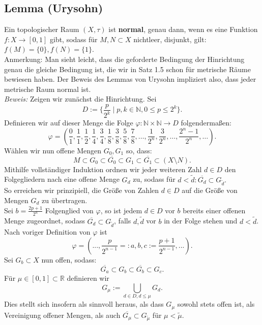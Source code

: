 \documentclass[11pt,leqno]{article}
\newcommand{\R}{\mathbb{R}}
\begin{document}
\subsection{Lemma (Urysohn)}

Ein topologischer Raum $(X, \tau)$ ist \textbf{normal}, genau dann, wenn es eine Funktion $f:X \rightarrow [0,1]$ gibt, sodass für $M,N \subset X$
nichtleer, disjunkt, gilt: $f(M)=\{0\}, f(N)=\{1\}$. \\
Anmerkung: Man sieht leicht, dass die geforderte Bedingung der Hinrichtung genau die gleiche Bedingung ist, die wir in Satz 1.5 schon für 
metrische Räume bewiesen haben. Der Beweis des Lemmas von Urysohn impliziert also, dass jeder metrische Raum normal ist.\\
\textit{Beweis:} Zeigen wir zunächst die Hinrichtung. Sei
\[D:= \{\frac{p}{2^k} \mid p,k \in \mathbb{N}, 0 \leq p \leq 2^k \}. \]
Definieren wir auf dieser Menge die Folge $\varphi: \mathbb{N} \times \mathbb{N} \rightarrow D$ folgendermaßen:
\[\varphi = (\frac{0}{1}, \frac{1}{1}, \frac{1}{2}, \frac{1}{4}, \frac{3}{4}, \frac{1}{8}, \frac{3}{8}, \frac{5}{8}, \frac{7}{8}, \dots, 
\frac{1}{2^n}, \frac{3}{2^n}, \dots, \frac{2^n-1}{2^n}, \dots).\]
Wählen wir nun offene Mengen $G_0, G_1$ so, dass: 
\[M \subset G_0 \subset \overline{G_0} \subset G_1 \subset \overline{G_1} \subset (X \setminus N). \]
Mithilfe vollständiger Induktion ordnen wir jeder weiteren Zahl $d \in D$ den Folgegliedern nach eine offene Menge $G_d$ zu, sodass für 
$d < \tilde{d}: \overline{G_d} \subset G_{\tilde{d}}.$ \\
So erreichen wir prinzipiell, die Größe von Zahlen $d \in D$ auf \glqq die Größe von Mengen $G_d$\grqq{} zu übertragen.\\
Sei $b = \frac{2p+1}{2^n}$ Folgenglied von $\varphi$, so ist jedem $d \in D$ vor $b$ bereits einer offenen Menge zugeordnet, sodass 
$\overline{G_d} \subset G_{\tilde{d}}$, falls $d, \tilde{d}$ vor $b$ in der Folge stehen und $d < \tilde{d}$. \\
Nach voriger Definition von $\varphi$ ist 
\[\varphi = ( ..., \frac{p}{2^{n-1}}=:a, b, c:=\frac{p+1}{2^{n-1}},...). \]
Sei $G_b \subset X$ nun offen, sodass:
\[\overline{G_a} \subset G_b \subset \overline{G_b} \subset G_c.\]
Für $\mu \in [0,1]\subset \R$ definieren wir \[G_\mu := \bigcup_{d \in D, d \leq \mu}G_d .\] 
Dies stellt sich insofern als sinnvoll heraus, als dass $G_\mu$ sowohl stets offen ist, als Vereinigung offener Mengen, als auch $\overline{G_\mu}
\subset G_{\tilde{\mu}}$ für $\mu <\tilde{\mu}$.\\
\end{document}

